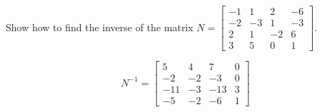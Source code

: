 
\begin{exerciseStatement}


Show how to find the inverse of the matrix \(N= \left[\begin{array}{cccc}
-1 & 1 & 2 & -6 \\
-2 & -3 & 1 & -3 \\
2 & 1 & -2 & 6 \\
3 & 5 & 0 & 1
\end{array}\right] \).


\end{exerciseStatement}
    
\begin{exerciseAnswer} 
\[N^{-1}= \left[\begin{array}{cccc}
5 & 4 & 7 & 0 \\
-2 & -2 & -3 & 0 \\
-11 & -3 & -13 & 3 \\
-5 & -2 & -6 & 1
\end{array}\right] \]
\end{exerciseAnswer}
    
